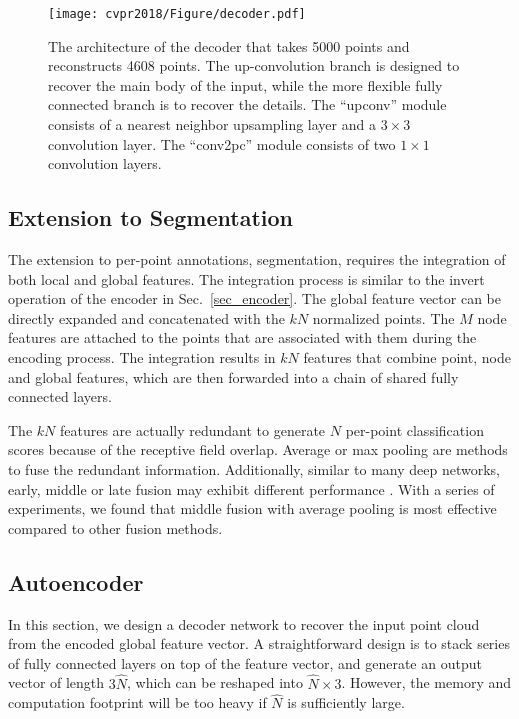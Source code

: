 \documentclass[10pt,twocolumn,letterpaper]{article}
\begin{document}
%
\begin{figure*}[t] \centering
\texttt{[image: cvpr2018/Figure/decoder.pdf]}
\caption{The architecture of the decoder that takes 5000 points and reconstructs 4608 points. The up-convolution branch is designed to recover the main body of the input, while the more flexible fully connected branch is to recover the details. The ``upconv'' module consists of a nearest neighbor upsampling layer and a $3\times3$ convolution layer. The ``conv2pc'' module consists of two $1\times1$ convolution layers.}\label{fig_decoder}
\vspace{-4pt}
\end{figure*}
%

\subsection{Extension to Segmentation} \label{sec_segmentation}
The extension to per-point annotations, \eg segmentation, requires the integration of both local and global features. The integration process is similar to the invert operation of the encoder in Sec.~\ref{sec_encoder}. The global feature vector can be directly expanded and concatenated with the $kN$ normalized points. The $M$ node features are attached to the points that are associated with them during the encoding process. The integration results in $kN$ features that combine point, node and global features, which are then forwarded into a chain of shared fully connected layers.

The $kN$ features are actually redundant to generate $N$ per-point classification scores 
because of the receptive field overlap. Average or max pooling are methods to fuse the redundant information. Additionally, similar to many deep networks, early, middle or late fusion may exhibit different performance \cite{cheng2017locality}. With a series of experiments, we found that middle fusion with average pooling is most effective compared to other fusion methods. 

\subsection{Autoencoder} \label{sec_autoencoder}

In this section, we design a decoder network to recover the input point cloud from the encoded global feature vector. A straightforward design is to stack series of fully connected layers on top of the feature vector, and generate an output vector of length $3\hat{N}$, which can be reshaped into $\hat{N}\times3$. However, the memory and computation footprint will be too heavy if $\hat{N}$ is sufficiently large.
\end{document}
